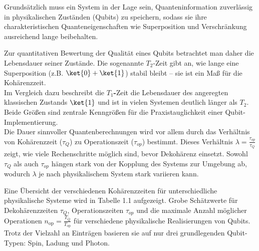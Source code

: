 Grundsätzlich muss ein System in der Lage sein, Quanteninformation zuverlässig in physikalischen Zuständen (Qubits) zu speichern, sodass sie ihre charakteristischen Quanteneigenschaften wie Superposition und Verschränkung ausreichend lange beibehalten. 


Zur quantitativen Bewertung der Qualität eines Qubits betrachtet man daher die Lebensdauer seiner Zustände. Die sogenannte \textbf{$T_2$}-Zeit gibt an, wie lange eine Superposition (z.B. 
$\ket{0} + \ket{1}$) stabil bleibt – sie ist ein Maß für die Kohärenzzeit. \\
Im Vergleich dazu beschreibt die \textbf{$T_1$-}Zeit die Lebensdauer des angeregten klassischen Zustands $\ket{1}$ und ist in vielen Systemen deutlich länger als $T_2$. Beide Größen sind zentrale Kenngrößen für die Praxistauglichkeit einer Qubit-Implementierung.\\

Die Dauer sinnvoller Quantenberechnungen wird vor allem durch das Verhältnis von Kohärenzzeit (\(\tau_Q\)) zu Operationszeit (\(\tau_{op}\)) bestimmt. Dieses Verhältnis 
\(\lambda = \frac{\tau_{op}}{\tau_Q}\) zeigt, wie viele Rechenschritte möglich sind, bevor Dekohärenz einsetzt. Sowohl \(\tau_Q\) als auch \(\tau_{op}\) hängen stark von der Kopplung des Systems zur Umgebung ab, wodurch \(\lambda\) je nach physikalischem System stark variieren kann. 


Eine Übersicht der verschiedenen Kohärenzzeiten für unterschiedliche physikalische Systeme wird in Tabelle 1.1 aufgezeigt. Grobe Schätzwerte für Dekohärenzzeiten \(\tau_Q\), Operationszeiten \(\tau_{op}\) und die maximale Anzahl möglicher Operationen  $n_{\text{op}} = \frac{T_Q}{T_{\text{op}}}$  für verschiedene physikalische Realisierungen von Qubits. Trotz der Vielzahl an Einträgen basieren sie auf nur drei grundlegenden Qubit-Typen: Spin, Ladung und Photon. 


